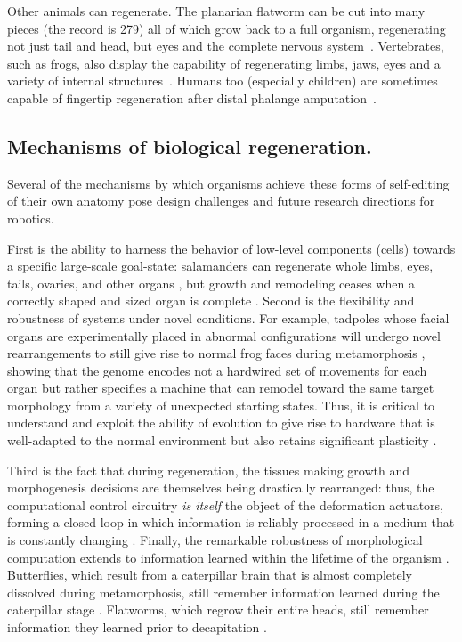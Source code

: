 Other animals can regenerate.
The planarian flatworm can be cut into many pieces (the record is 279) all of which grow back to a full organism, regenerating not just tail and head, but eyes and the complete nervous system~\cite{montgomery1974minimal}.
Vertebrates, such as 
frogs, also display the capability of regenerating limbs, 
jaws, eyes and a variety of internal structures~\cite{brockes1997amphibian}. 
Humans too (especially children) are sometimes capable of fingertip regeneration after distal phalange amputation~\cite{illingworth1974trapped}. 

\subsection*{Mechanisms of biological regeneration.}

Several of the mechanisms by which organisms achieve these forms of 
self-editing of their own anatomy pose design
challenges and future research directions for robotics.

First is the ability to harness the behavior of low-level components (cells) towards a specific large-scale goal-state: salamanders can regenerate whole limbs, eyes, tails, ovaries, and other organs \cite{mccusker2011axolotl},
but growth and remodeling ceases when a correctly shaped and sized organ is complete \cite{pezzulo2016top}.
Second is the flexibility and robustness of systems under novel conditions. For example, tadpoles whose facial organs are experimentally placed in abnormal configurations will undergo novel rearrangements to still give rise to normal frog faces during metamorphosis \cite{vandenberg2012normalized}, 
showing that the genome encodes not a hardwired set of movements for each organ but rather specifies a machine that can remodel toward the same target morphology from a variety of unexpected starting states. 
Thus, it is critical to understand and exploit the ability of evolution to give rise to hardware that is well-adapted to the normal environment but also retains significant plasticity \cite{sullivan2016physiological}. 

Third is the fact that during regeneration, the tissues making growth and morphogenesis decisions are themselves being drastically rearranged: thus, the computational control circuitry \textit{is itself} the object of the deformation actuators, forming a closed loop in which information is reliably processed in a medium that is constantly changing \cite{pezzulo2015re}. 
Finally, the remarkable robustness of morphological computation extends to information learned within the lifetime of the organism \cite{blackiston2015stability}.
Butterflies, which result from a caterpillar brain that is almost completely dissolved during metamorphosis, still remember information learned during the caterpillar stage \cite{blackiston2008retention}. 
Flatworms, which regrow their entire heads, still remember information they learned prior to decapitation \cite{corning1967regeneration, shomrat2013automated}. 

